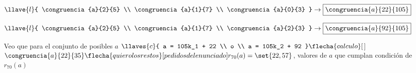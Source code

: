 \begin{minipage}{0.5\textwidth}
	\centering
	$
		\llave{l}{
			\congruencia{a}{2}{5} \\
			\congruencia{a}{1}{7} \\
			\congruencia{a}{0}{3}
		}
		\to \boxed{\congruencia{a}{22}{105} }
	$
\end{minipage}
\begin{minipage}{0.5\textwidth}
	\centering
	$\llave{l}{
			\congruencia{a}{2}{5} \\
			\congruencia{a}{1}{7} \\
			\congruencia{a}{2}{3}
		}
		\to \boxed{\congruencia{a}{92}{105} }
	$
\end{minipage}
Veo que para el conjunto de posibles $a$
$\llaves{c}{
		a = 105k_1 + 22 \\
		o \\
		a = 105k_2 + 92
	}\flecha{calculo}[$$]$
$\congruencia{a}{22}{35} \flecha{quiero los restos}[pedidos del enunciado] r_{70}(a) = \set{22, 57}$,
valores de $a$ que cumplan condición de $r_{70}(a)$
